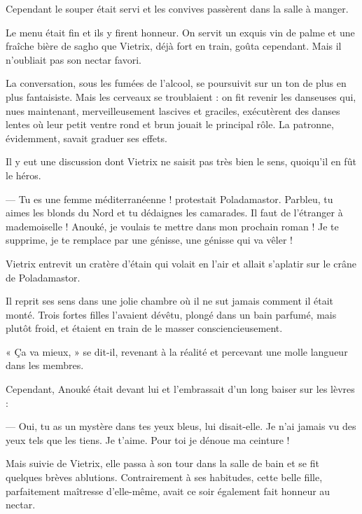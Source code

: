 \documentclass[a4paper, 11pt, oneside, polutonikogreek, french]{article}
\begin{document}
\bigskip
\centerline{\EightStarTaper}
\centerline{\EightStarTaper\EightStarTaper}
\bigskip

Cependant le souper était servi et les convives passèrent dans la salle à manger.

Le menu était fin et ils y firent honneur. On servit un exquis vin de palme et une fraîche bière de sagho que Vietrix, déjà fort en train, goûta cependant. Mais il n'oubliait pas son nectar favori.

La conversation, sous les fumées de l'alcool, se poursuivit sur un ton de plus en plus fantaisiste. Mais les cerveaux se troublaient : on fit revenir les danseuses qui, nues maintenant, merveilleusement lascives et graciles, exécutèrent des danses lentes où leur petit ventre rond et brun jouait le principal rôle. La patronne, évidemment, savait graduer ses effets.

Il y eut une discussion dont Vietrix ne saisit pas très bien le sens, quoiqu'il en fût le héros.

--- Tu es une femme méditerranéenne ! protestait Poladamastor. Parbleu, tu aimes les blonds du Nord et tu dédaignes les camarades. Il faut de l'étranger à mademoiselle ! Anouké, je voulais te mettre dans mon prochain roman ! Je te supprime, je te remplace par une génisse, une génisse qui va vêler !

Vietrix entrevit un cratère d'étain qui volait en l'air et allait s'aplatir sur le crâne de Poladamastor.

\bigskip
\centerline{\EightStarTaper}
\centerline{\EightStarTaper\EightStarTaper}
\bigskip

Il reprit ses sens dans une jolie chambre où il ne sut jamais comment il était monté. Trois fortes filles l'avaient dévêtu, plongé dans un bain parfumé, mais plutôt froid, et étaient en train de le masser consciencieusement.

« Ça va mieux, » se dit-il, revenant à la réalité et percevant une molle langueur dans les membres.

Cependant, Anouké était devant lui et l'embrassait d'un long baiser sur les lèvres :

--- Oui, tu as un mystère dans tes yeux bleus, lui disait-elle. Je n'ai jamais vu des yeux tels que les tiens. Je t'aime. Pour toi je dénoue ma ceinture !

Mais suivie de Vietrix, elle passa à son tour dans la salle de bain et se fit quelques brèves ablutions. Contrairement à ses habitudes, cette belle fille, parfaitement maîtresse d'elle-même, avait ce soir également fait honneur au nectar.
\end{document}
